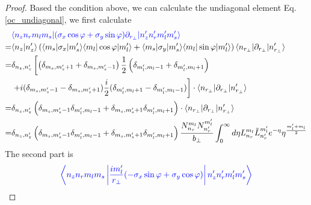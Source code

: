 \begin{proof}
    Based the condition above, we can calculate the undiagonal element Eq.\eqref{oc_undiagonal}, we first calculate
    \begin{equation}
      \begin{aligned}
        &\textcolor{blue}{\langle n_z n_r m_l m_s | (\sigma_x \cos\varphi + \sigma_{y}\sin\varphi)\partial_{r_{\perp}}| n_z^{\prime} n_r^{\prime} m_l^{\prime} m_s^{\prime} \rangle}\\
        =& \langle n_z | n_z^{\prime} \rangle \left(\langle m_s | \sigma_x | m_s^{\prime} \rangle \langle m_l | \cos\varphi | m_l^{\prime} \rangle + \langle m_s | \sigma_y | m_s^{\prime} \rangle \langle m_l | \sin\varphi | m_l^{\prime}\rangle\right) \langle n_{r_{\perp}} | \partial_{r_{\perp}} | n_{r_\perp}^{\prime} \rangle \\
        =& \delta_{n_z,n_z^{\prime}} \left[\left( \delta_{m_s,m_s^{\prime}+1} + \delta_{m_s,m_s^{\prime}-1} \right) \frac{1}{2}\left(\delta_{m_{l}^{\prime},m_{l}-1}+\delta_{m_{l}^{\prime},m_{l}+1}\right) \right. \\
        & \left. + i(\delta_{m_s,m_s^{\prime}-1} - \delta_{m_s,m_s^{\prime}+1}) \frac{i}{2} (\delta _{m_{l}^{\prime},m_{l}+1} - \delta_{m_{l}^{\prime},m_{l}-1}) \right] \cdot \langle n_{r_{\perp}} | \partial_{r_{\perp}} | n_{r_\perp}^{\prime} \rangle \\
        =& \delta_{n_z,n_z^{\prime}} \left( \delta_{m_s,m_s^{\prime}-1} \delta_{m_{l}^{\prime},m_{l}-1} + \delta_{m_s,m_s^{\prime}+1} \delta _{m_{l}^{\prime},m_{l}+1} \right) \cdot \langle n_{r_{\perp}} | \partial_{r_{\perp}} | n_{r_\perp}^{\prime} \rangle\\
        =& \delta_{n_z,n_z^{\prime}} \left( \delta_{m_s,m_s^{\prime}-1} \delta_{m_{l}^{\prime},m_{l}-1} + \delta_{m_s,m_s^{\prime}+1} \delta _{m_{l}^{\prime},m_{l}+1} \right) \frac{N_{n_r}^{m_l} N_{n_r^{\prime}}^{m_l^{\prime}}}{b_{\perp}} \int_{0}^{\infty} d\eta L_{n_r}^{m_l}\tilde{L}_{n_r^\prime}^{m_l^\prime} e^{-\eta} \eta^{\frac{m_{l}^{\prime} + m_l}{2}} \\
      \end{aligned}
    \end{equation}
    The second part is 
    \begin{equation}
      \begin{aligned}
        &\textcolor{blue}{\left\langle n_z n_r m_l m_s \left| \frac{i m_l^\prime}{r_{\perp}}( -\sigma_x \sin\varphi + \sigma_{y}\cos\varphi) \right| n_z^{\prime} n_r^{\prime} m_l^{\prime} m_s^{\prime} \right\rangle}\\

\end{aligned}
\end{equation}
\end{proof}
